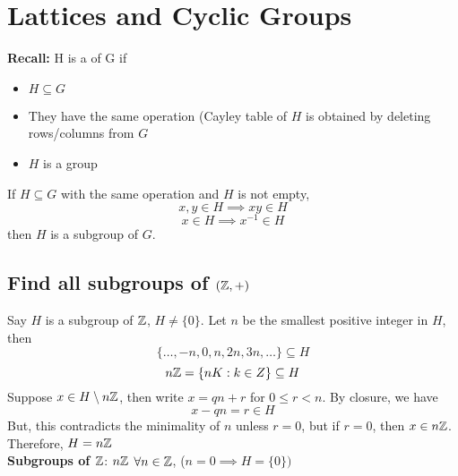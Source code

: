 \documentclass[openany]{report}
\begin{document}
\chapter{Lattices and Cyclic Groups}
\textbf{Recall:} H is a  of G if 
\begin{itemize}
    \item $H \subseteq G$
    \item They have the same operation (Cayley table of $H$ is obtained by deleting rows/columns from $G$
    \item $H$ is a group
\end{itemize}
\textbf{} 
If $H \subseteq G$ with the same operation and $H$ is not empty,
$$x,y \in H \implies xy \in H$$
$$x \in H \implies x^{-1} \in H$$
then $H$ is a subgroup of $G$. 

\section{Find all subgroups of $(\mathbb{Z}, +)$}
Say $H$ is a subgroup of $\mathbb{Z}$, $H \neq \{0\}$. Let $n$ be the smallest positive integer in $H$, then 
$$\{\dots, -n, 0, n, 2n, 3n, \dots\} \subseteq H$$
$$n\mathbb{Z} = \{nK : k\in Z\} \subseteq H$$
Suppose $x \in H \setminus n\mathbb{Z}$, then write $x = qn + r$ for $0 \leq r < n$. By closure, we have
$$ x - qn = r \in H$$
But, this contradicts the minimality of $n$ unless $r = 0$, but if $r = 0$, then $x \in n\mathbb{Z}$. Therefore, $H = n \mathbb{Z}$\\[2ex]

\textbf{Subgroups of $\mathbb{Z}$}: $n\mathbb{Z}$ $\forall n \in \mathbb{Z}$, ($n = 0 \implies H = \{0\})$
\end{document}
